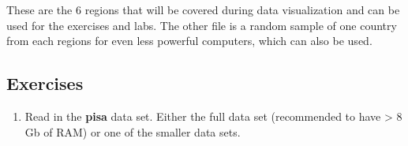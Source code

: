 \documentclass[]{book}
\newenvironment{Shaded}{\begin{snugshade}}{\end{snugshade}}
\newcommand{\DataTypeTok}[1]{\textcolor[rgb]{0.13,0.29,0.53}{#1}}
\newcommand{\KeywordTok}[1]{\textcolor[rgb]{0.13,0.29,0.53}{\textbf{#1}}}
\newcommand{\NormalTok}[1]{#1}
\newcommand{\OperatorTok}[1]{\textcolor[rgb]{0.81,0.36,0.00}{\textbf{#1}}}
\newcommand{\StringTok}[1]{\textcolor[rgb]{0.31,0.60,0.02}{#1}}
\providecommand{\tightlist}{%
  \setlength{\itemsep}{0pt}\setlength{\parskip}{0pt}}
\begin{document}
\begin{Shaded}
\end{Shaded}

These are the 6 regions that will be covered during data visualization and can be used for the exercises and labs. The other file is a random sample of one country from each regions for even less powerful computers, which can also be used.

\begin{Shaded}
\end{Shaded}

\hypertarget{exercises}{%
\subsection{Exercises}\label{exercises}}

\begin{enumerate}
\def\labelenumi{\arabic{enumi}.}
\tightlist
\item
  Read in the \textbf{pisa} data set. Either the full data set (recommended to have \textgreater{} 8 Gb of RAM) or one of the smaller data sets.
\end{enumerate}
\end{document}
